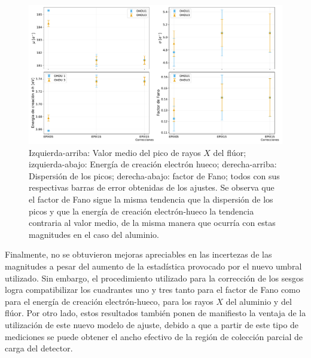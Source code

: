 \begin{figure}[h]
    \centering
        \includegraphics[scale=0.45]{Figs/F_mu_sigma_fano_Eeh.pdf}
    \caption{Izquierda-arriba: Valor medio del pico de rayos $X$ del flúor; izquierda-abajo: Energía de creación electrón hueco; derecha-arriba: Dispersión de los picos; derecha-abajo: factor de Fano; todos con sus respectivas barras de error obtenidas de los ajustes. Se observa que el factor de Fano sigue la misma tendencia que la dispersión de los picos y que la energía de creación electrón-hueco la tendencia contraria al valor medio, de la misma manera que ocurría con estas magnitudes en el caso del aluminio.}
    \label{fig:F_mu_sigma_fano_eh}
\end{figure}

Finalmente, no se obtuvieron mejoras apreciables en las incertezas de las magnitudes a pesar del aumento de la estadística provocado por el nuevo umbral utilizado. Sin embargo, el procedimiento utilizado para la corrección de los sesgos logra compatibilizar los cuadrantes uno y tres tanto para el factor de Fano como para el energía de creación electrón-hueco, para los rayos $X$ del aluminio y del flúor. Por otro lado, estos resultados también ponen de manifiesto la ventaja de la utilización de este nuevo modelo de ajuste, debido a que a partir de este tipo de mediciones se puede obtener el ancho efectivo de la región de colección parcial de carga del detector.


